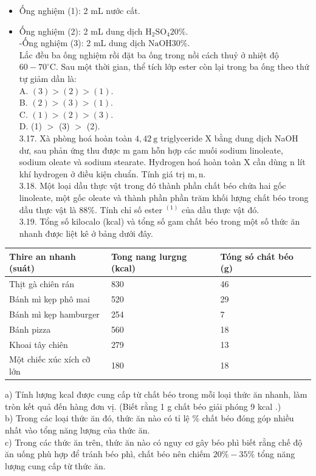 \documentclass[10pt]{article}
\begin{document}
\begin{itemize}
  \item Ống nghiệm (1): 2 mL nước cất.
  \item Ống nghiệm (2): 2 mL dung dịch $\mathrm{H}_{2} \mathrm{SO}_{4} 20 \%$.\\
-Ống nghiệm (3): 2 mL dung dịch $\mathrm{NaOH} 30 \%$.\\
Lắc đều ba ống nghiệm rồi đặt ba ống trong nồi cách thuỷ ở nhiệt độ $60-70^{\circ} \mathrm{C}$. Sau một thời gian, thể tích lớp ester còn lại trong ba ống theo thứ tự giảm dần là:\\
A. $(3)>(2)>(1)$.\\
B. $(2)>(3)>(1)$.\\
C. $(1)>(2)>(3)$.\\
D. (1) $>$ (3) $>$ (2).\\
3.17. Xà phòng hoá hoàn toàn $4,42 \mathrm{~g}$ triglyceride X bằng dung dịch NaOH dư, sau phản ứng thu được m gam hỗn hợp các muối sodium linoleate, sodium oleate và sodium stearate. Hydrogen hoá hoàn toàn X cần dùng n lít khí hydrogen ở điều kiện chuẩn. Tính giá trị $\mathrm{m}, \mathrm{n}$.\\
3.18. Một loại dầu thực vật trong đó thành phần chất béo chứa hai gốc linoleate, một gốc oleate và thành phần phần trăm khối lượng chất béo trong dầu thực vật là $88 \%$. Tính chỉ số ester ${ }^{(1)}$ của dầu thực vật đó.\\
3.19. Tổng số kilocalo (kcal) và tổng số gam chất béo trong một số thức ăn nhanh được liệt kê ở bảng dưới đây.
\end{itemize}

\begin{center}
\begin{tabular}{|l|l|l|}
\hline
Thire an nhanh (suát) & Tong nang lurgng (kcal) & Tóng só chát béo (g) \\
\hline
Thịt gà chiên rán & 830 & 46 \\
\hline
Bánh mì kẹp phô mai & 520 & 29 \\
\hline
Bánh mì kẹp hamburger & 254 & 7 \\
\hline
Bánh pizza & 560 & 18 \\
\hline
Khoai tây chiên & 279 & 13 \\
\hline
Một chiếc xúc xích cỡ lớn & 180 & 18 \\
\hline
\end{tabular}
\end{center}

a) Tính lượng kcal được cung cấp từ chất béo trong mỗi loại thức ăn nhanh, làm tròn kết quả đến hàng đơn vị. (Biết rằng 1 g chất béo giải phóng 9 kcal .)\\
b) Trong các loại thức ăn đó, thức ăn nào có tỉ lệ \% chất béo đóng góp nhiều nhất vào tổng năng lượng của thức ăn.\\
c) Trong các thức ăn trên, thức ăn nào có nguy cơ gây béo phì biết rằng chế độ ăn uống phù hợp để tránh béo phì, chất béo nên chiếm $20 \%-35 \%$ tổng năng lượng cung cấp từ thức ăn.
\end{document}
